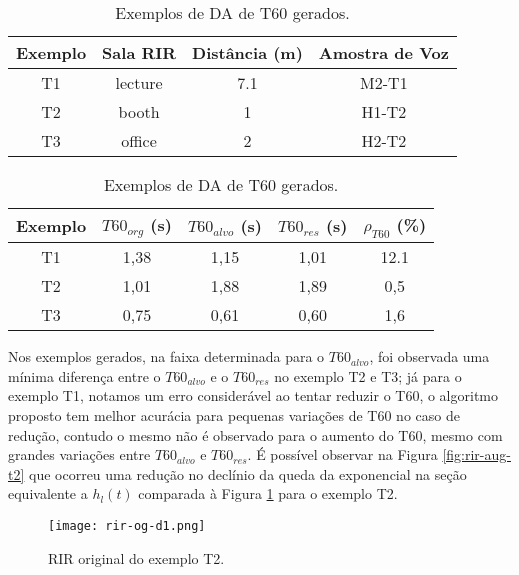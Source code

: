 \begin{table} [H]
    \centering
    \caption{Exemplos de DA de T60 gerados.}
    \label{tbl:da-t60}
    \begin{tabular}{c|c|c|c}

        \textbf{Exemplo} & 
        \textbf{Sala RIR} & 
        \textbf{Distância (m)} &
        \textbf{Amostra de Voz} \\
        \hline 

        T1 & lecture & 7.1 & M2-T1 \\
        T2 & booth & 1 & H1-T2 \\
        T3 & office & 2 & H2-T2 \\

    \end{tabular}
    \bigbreak
    \bigbreak
    \begin{tabular}{c|c|c|c|c}

        \textbf{Exemplo} & 
        \textbf{$T60_{org}$ (s)} & 
        \textbf{$T60_{alvo}$ (s)} &
        \textbf{$T60_{res}$ (s)} & 
        \textbf{$\rho_{T60}$ (\%)} \\
        \hline 

        T1 & 1,38 & 1,15 & 1,01 & 12.1 \\
        T2 & 1,01 & 1,88 & 1,89 & 0,5 \\
        T3 & 0,75 & 0,61 & 0,60 & 1,6 \\

    \end{tabular}
\end{table}

Nos exemplos gerados, na faixa determinada para o $T60_{alvo}$, foi observada uma mínima diferença entre o $T60_{alvo}$ e o $T60_{res}$ no exemplo T2 e T3;
já para o exemplo T1, notamos um erro considerável ao tentar reduzir o T60, o algoritmo proposto tem melhor acurácia para pequenas variações de T60 no caso de
redução, contudo o mesmo não é observado para o aumento do T60, mesmo com grandes variações entre $T60_{alvo}$ e $T60_{res}$.
É possível observar na Figura \ref{fig:rir-aug-t2} que ocorreu uma redução no declínio da queda da exponencial na seção equivalente a $h_l(t)$
comparada à Figura \ref{fig:rir-og-t2} para o exemplo T2.

\begin{figure} [H]
    \centering
    \texttt{[image: rir-og-d1.png]}
    \caption{RIR original do exemplo T2.}
    \label{fig:rir-og-t2}
\end{figure} 

